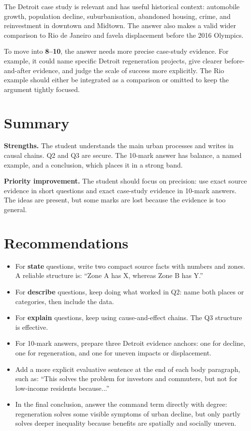 \documentclass[11pt,a4paper]{article}
\newcommand{\term}[1]{\textcolor{HeadingBlue}{\textbf{#1}}}
\newcommand{\score}[1]{\textcolor{AccentTeal}{\textbf{#1}}}
\newcommand{\boxnote}[3]{%
\noindent\colorbox{#1}{%
  \begin{minipage}{0.965\textwidth}
  \sffamily
  \textbf{\textcolor{HeadingBlue}{#2}} #3
  \end{minipage}
}}
\begin{document}
The Detroit case study is relevant and has useful historical context:
automobile growth, population decline, suburbanisation, abandoned housing, crime,
and reinvestment in downtown and Midtown. The answer also makes a valid wider
comparison to Rio de Janeiro and favela displacement before the 2016 Olympics.

To move into \score{8--10}, the answer needs more precise case-study evidence.
For example, it could name specific Detroit regeneration projects, give clearer
before-and-after evidence, and judge the scale of success more explicitly. The
Rio example should either be integrated as a comparison or omitted to keep the
argument tightly focused.

\section{Summary}

\boxnote{SoftGreen}{Strengths.}{The student understands the main urban
processes and writes in causal chains. Q2 and Q3 are secure. The 10-mark answer
has balance, a named example, and a conclusion, which places it in a strong
band.}

\boxnote{SoftGold}{Priority improvement.}{The student should focus on
precision: use exact source evidence in short questions and exact case-study
evidence in 10-mark answers. The ideas are present, but some marks are lost
because the evidence is too general.}

\section{Recommendations}

\begin{itemize}
  \item For \term{state} questions, write two compact source facts with numbers
  and zones. A reliable structure is: ``Zone A has X, whereas Zone B has Y.''
  \item For \term{describe} questions, keep doing what worked in Q2: name both
  places or categories, then include the data.
  \item For \term{explain} questions, keep using cause-and-effect chains. The
  Q3 structure is effective.
  \item For 10-mark answers, prepare three Detroit evidence anchors: one for
  decline, one for regeneration, and one for uneven impacts or displacement.
  \item Add a more explicit evaluative sentence at the end of each body
  paragraph, such as: ``This solves the problem for investors and commuters, but
  not for low-income residents because...''
  \item In the final conclusion, answer the command term directly with degree:
  regeneration solves some visible symptoms of urban decline, but only partly
  solves deeper inequality because benefits are spatially and socially uneven.
\end{itemize}
\end{document}
